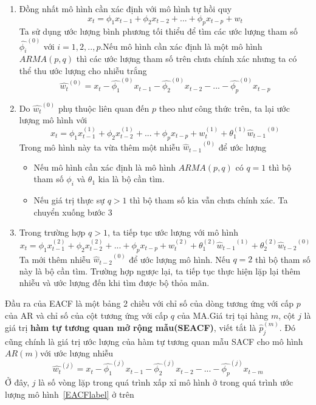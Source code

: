 \documentclass[twoside,12pt]{Latex/Classes/PhDthesisPSnPDF}
\begin{document}
\begin{enumerate}
\item Đồng nhất mô hình cần xác định với mô hình tự hồi quy
	\begin{equation}
		x_t = \phi_1x_{t-1}+\phi_2x_{t-2}+...+\phi_px_{t-p}+w_t
	\end{equation}
Ta sử dụng ước lượng bình phương tối thiểu để tìm các ước lượng tham số $\hat{\phi_i}^{(0)}$ với $i=1,2,..,p$.Nếu mô hình cần xác định là một mô hình $ARMA(p,q)$ thì các ước lượng tham số trên chưa chính xác nhưng ta có thể thu ước lượng cho nhiễu trắng
\begin{equation}
	\hat{w_t}^{(0)} = x_t - \hat{\phi_1}^{(0)}x_{t-1}-\hat{\phi_2}^{(0)}x_{t-2}-...-\hat{\phi_p}^{(0)}x_{t-p}
	\end{equation}
	\item Do $\hat{w_t}^{(0)}$ phụ thuộc liên quan đến $p$ theo như công thức trên, ta lại ước lượng mô hình với 
	\begin{equation}
		x_t = \phi_1x_{t-1}^{(1)}+\phi_2x_{t-2}^{(1)}+...+\phi_px_{t-p}+w_t^{(1)}+\theta_{1}^{(1)}{\hat{w}_{t-1}}^{(0)}
	\end{equation}
Trong mô hình này ta vừa thêm một nhiễu ${\hat{w}_{t-1}}^{(0)}$ để ước lượng
	\begin{itemize}
		\item Nếu mô hình cần xác định là mô hình $ARMA(p,q)$ có $q=1$ thì bộ tham số $\phi_i$ và $\theta_1$ kia là bộ cần tìm.
		\item Nếu giá trị thực sự $q>1$ thì bộ tham số kia vẫn chưa chính xác. Ta chuyển xuống bước 3
	\end{itemize}
\item Trong trường hợp $q>1$, ta tiếp tục ước lượng với mô hình 
	\begin{equation}
		x_t = \phi_1x_{t-1}^{(2)}+\phi_2x_{t-2}^{(2)}+...+\phi_px_{t-p}+w_t^{(2)}+\theta_{1}^{(2)}{\hat{w}_{t-1}}^{(1)} + \theta_{2}^{(2)}{\hat{w}_{t-2}}^{(0)}
	\end{equation}
	Ta mới thêm nhiễu ${\hat{w}_{t-2}}^{(0)}$ để ước lượng mô hình. Nếu $q=2$ thì bộ tham số này là bộ cần tìm. Trường hợp ngược lại, ta tiếp tục thực hiện lặp lại thêm nhiễu và ước lượng đến khi tìm được bộ thỏa mãn.
\end{enumerate}

Đầu ra của EACF là một bảng 2 chiều với chỉ số của dòng tương ứng với cấp $p$ của AR và chỉ số của cột tương ứng với cấp $q$ của MA.Giá trị tại hàng $m$, cột $j$ là giá trị \textbf{hàm tự tương quan mở rộng mẫu(SEACF)}, viết tắt là \textbf{$\hat{p}_j^{(m)}$}. Đó cũng chính là giá trị ước lượng của hàm tự tương quan mẫu SACF cho mô hình $AR(m)$với ước lượng nhiễu
\begin{equation}
	\hat{w_t}^{(j)} = x_t - \hat{\phi_1}^{(j)}x_{t-1}-\hat{\phi_2}^{(j)}x_{t-2}-...-\hat{\phi_p}^{(j)}x_{t-m}
\end{equation}
Ở đây, $j$ là số vòng lặp trong quá trình xấp xỉ mô hình ở trong quá trình ước lượng mô hình~\ref{EACFlabel} ở trên 
\label{SEACFfig}
\end{document}
